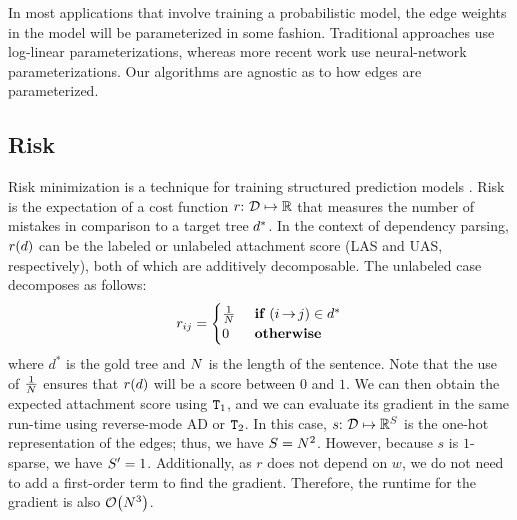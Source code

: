 \documentclass[11pt,a4paper]{article}
\theoremstyle{definition}
\begin{document}
In most applications that involve training a probabilistic model, the edge weights in the model will be parameterized in some fashion.
Traditional approaches \cite{koo-et-al-2007, smith-smith-2007, mcdonald,druck-thesis} use log-linear parameterizations, whereas more recent work \cite{dozat, liu-lapata-2018-learning, ma-xia-2014-unsupervised} use neural-network parameterizations.
Our algorithms are agnostic as to how edges are parameterized.

\subsection{Risk}\label{sec:uas}
Risk minimization is a technique for training structured prediction models \citep{li-eisner-2009, smith-eisner-2006-minimum, stoyanov-eisner-2012-minimum}.
Risk is the expectation of a cost function $r{:}\,\,{\mathcal{D}} \mapsto \mathbb{R}$ that measures the number of mistakes in comparison to a target tree ${d}^*$.
In the context of dependency parsing, ${r({d})}$ can be the labeled or unlabeled attachment score (LAS and UAS, respectively), both of which are additively decomposable.
The unlabeled case decomposes as follows:
\begin{equation}
    {r_{ij}}=
    \begin{cases}
    \frac{1}{{N}} &  \textbf{ if } {(i\,{\rightarrow}\,j)} \in {d}^* \\
    0 &  \textbf{ otherwise}
    \end{cases}
\end{equation}
where $d^*$ is the gold tree and ${N}$ is the length of the sentence.
Note that the use of $\frac{1}{{N}}$ ensures that ${r({d})}$ will be a score between $0$ and $1$.
We can then obtain the expected attachment score using $\texttt{T}_1$, and we can evaluate its gradient in the same run-time using reverse-mode AD or $\texttt{T}_2$.
In this case, $s{:}\,\,{\mathcal{D}} \mapsto \mathbb{R}^{{S}}$ is the one-hot representation of the edges; thus, we have ${S}={N}^2$. 
However, because $s$ is $1$-sparse, we have ${S'}=1$.
Additionally, as $r$ does not depend on $w$, we do not need to add a first-order term to find the gradient.
Therefore, the runtime for the gradient is also $\mathcal{O}\!\left({N}^3\right)$.
\end{document}
